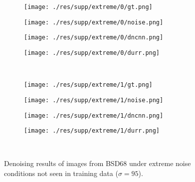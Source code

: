 \documentclass{article} %
\begin{document}
\begin{figure}[htp!]
	\centering
	\begin{subfigure}[t]{0.22\textwidth}
		\centering
		\texttt{[image: ./res/supp/extreme/0/gt.png]}
	\end{subfigure}
	\quad
	\begin{subfigure}[t]{0.22\textwidth}
		\centering
		\texttt{[image: ./res/supp/extreme/0/noise.png]}
	\end{subfigure}
	\quad
	\begin{subfigure}[t]{0.22\textwidth}
		\centering
		\texttt{[image: ./res/supp/extreme/0/dncnn.png]}
	\end{subfigure}
	\quad
	\begin{subfigure}[t]{0.22\textwidth}
		\centering
		\texttt{[image: ./res/supp/extreme/0/durr.png]}
	\end{subfigure}\\
	\centering
	\begin{subfigure}[t]{0.22\textwidth}
		\centering
		\texttt{[image: ./res/supp/extreme/1/gt.png]}
	\end{subfigure}
	\quad
	\begin{subfigure}[t]{0.22\textwidth}
		\centering
		\texttt{[image: ./res/supp/extreme/1/noise.png]}
	\end{subfigure}
	\quad
	\begin{subfigure}[t]{0.22\textwidth}
		\centering
		\texttt{[image: ./res/supp/extreme/1/dncnn.png]}
	\end{subfigure}
	\quad
	\begin{subfigure}[t]{0.22\textwidth}
		\centering
		\texttt{[image: ./res/supp/extreme/1/durr.png]}
	\end{subfigure}\\
	\caption{Denoising results of images from BSD68 under
		extreme noise conditions not seen in training data ($\sigma=95$).}
	\label{appeal}
\end{figure}
\end{document}
